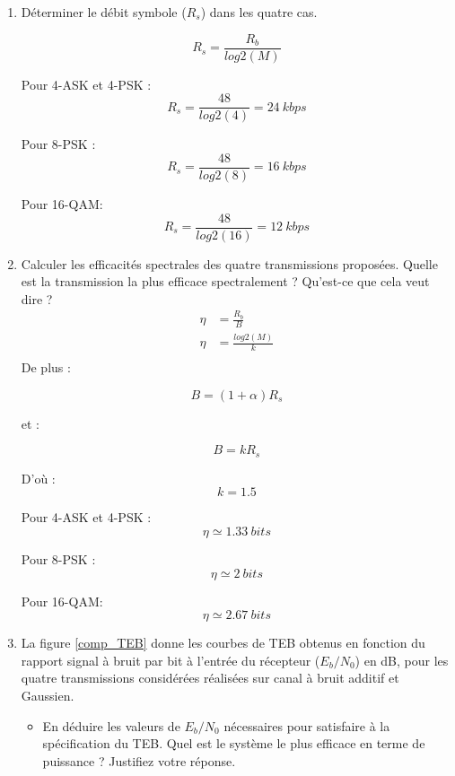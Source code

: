 \documentclass[frenchb]{article}
\begin{document}
\begin{enumerate}
    
    \item Déterminer le débit symbole ($R_s$) dans les quatre cas.
    
    $$ R_s = \frac{R_b}{log2(M)}$$
    
    Pour 4-ASK et 4-PSK : 
    $$ R_s = \frac{48}{log2(4)}= 24 \ kbps$$ 
    
    Pour 8-PSK : 
    $$ R_s = \frac{48}{log2(8)} = 16 \ kbps$$ 
    
    Pour 16-QAM: 
    $$ R_s = \frac{48}{log2(16)} = 12 \ kbps$$ 
    
    \item Calculer les efficacités spectrales des quatre transmissions proposées. Quelle est la transmission la plus efficace spectralement ? Qu'est-ce que cela veut dire ?
    \begin{equation*}
    \begin{split}
    \eta & = \frac{R_b}{B} \\
    \eta & = \frac{log2(M)}{k} \\
    \end{split}
    \end{equation*}
     De plus : 
     
    $$ B = (1+\alpha) R_s $$
    
    et : 
    
    $$ B = k R_s $$
    
    D'où : 
    $$ k = 1.5 $$
    
    
    Pour 4-ASK et 4-PSK : 
    $$ \eta \simeq 1.33 \ bits $$ 
    
    Pour 8-PSK : 
    $$ \eta \simeq 2 \ bits $$ 
    
    
    Pour 16-QAM: 
    $$ \eta \simeq 2.67 \ bits $$ 
     
    
     
    \item La figure \ref{comp_TEB} donne les courbes de  TEB obtenus en fonction du rapport signal à bruit par bit à l'entrée du récepteur ($E_b/N_0$) en dB, pour les quatre transmissions considérées réalisées sur canal à bruit additif et Gaussien.
        \begin{itemize}
            \item En déduire les valeurs de $E_b/N_0$ nécessaires pour satisfaire à la spécification du TEB. Quel est le système le plus efficace en terme de puissance ? Justifiez votre réponse.\\
            
            \setlength{\parindent}{0.5cm}
            

\end{itemize}
\end{enumerate}
\end{document}
